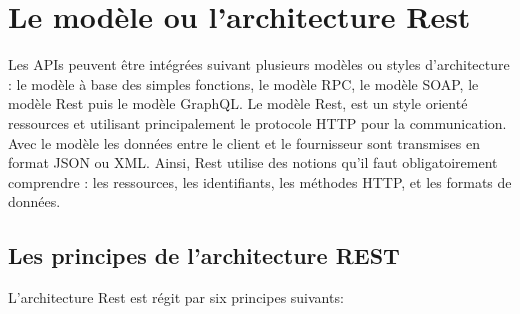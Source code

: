 \section{Le modèle ou l'architecture Rest}
Les APIs peuvent être intégrées suivant plusieurs modèles ou styles d’architecture : le modèle à base des
simples fonctions, le modèle RPC, le modèle SOAP, le modèle Rest puis le modèle GraphQL.
Le modèle Rest, est un style orienté ressources et utilisant principalement le protocole HTTP pour la communication. Avec le modèle les données entre le client et le fournisseur sont transmises en format JSON ou
XML. Ainsi, Rest utilise des notions qu’il faut obligatoirement comprendre : les ressources, les identifiants, les méthodes HTTP, et les formats de données.
\subsection{Les principes de l’architecture REST}
L'architecture Rest est régit par six principes suivants:
